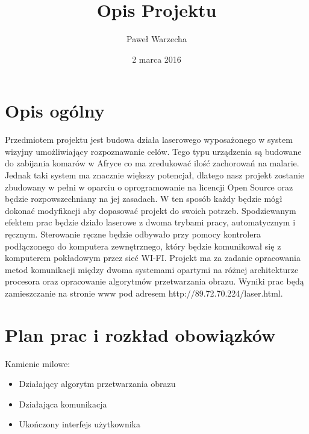 \documentclass[10pt, a4paper]{article}%
\begin{document}
\title{Opis Projektu}
\author{Paweł Warzecha}
\date{2 marca 2016}
\maketitle

\section{Opis ogólny}

\hspace{15pt}Przedmiotem projektu jest budowa działa laserowego wyposażonego w system wizyjny umożliwiający rozpoznawanie celów. Tego typu urządzenia są budowane do zabijania komarów w Afryce co ma zredukować ilość zachorowań na malarie. Jednak taki system ma znacznie większy potencjał, dlatego nasz projekt zostanie zbudowany w pełni w oparciu o oprogramowanie na licencji Open Source oraz będzie rozpowszechniany na jej zasadach. W ten sposób każdy będzie mógł dokonać modyfikacji aby dopasować projekt do swoich potrzeb. Spodziewanym efektem prac będzie działo laserowe z dwoma trybami pracy, automatycznym i ręcznym. Sterowanie ręczne będzie odbywało przy pomocy kontrolera podłączonego do komputera zewnętrznego, który będzie komunikował się z komputerem pokładowym przez sieć WI-FI. Projekt ma za zadanie opracowania metod komunikacji między dwoma systemami opartymi na różnej architekturze procesora oraz opracowanie algorytmów przetwarzania obrazu. Wyniki prac będą zamieszczanie na stronie www pod adresem
http://89.72.70.224/laser.html.



\section{Plan prac i rozkład obowiązków}

\noindent \newline Kamienie milowe: 

\begin{itemize}
  \item Działający algorytm przetwarzania obrazu
  \item Działająca komunikacja
	\item Ukończony interfejs użytkownika
\end{itemize}
\end{document}

